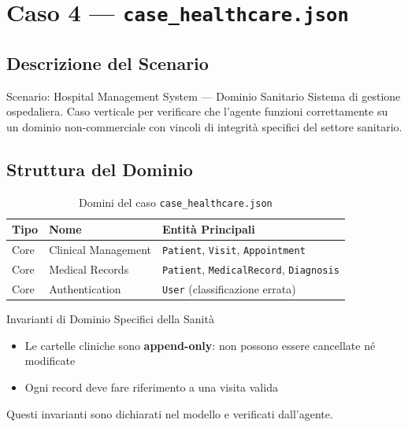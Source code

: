 \documentclass[12pt,a4paper]{report}
\begin{document}
\clearpage

\chapter{Caso 4 --- \texttt{case\_healthcare.json}}

\section{Descrizione del Scenario}

\begin{technicalbox}{Scenario: Hospital Management System --- Dominio Sanitario}
Sistema di gestione ospedaliera. Caso verticale per verificare che l'agente funzioni
correttamente su un dominio non-commerciale con vincoli di integrità specifici del
settore sanitario.
\end{technicalbox}

\section{Struttura del Dominio}

\begin{table}[H]
\centering
\renewcommand{\arraystretch}{1.3}
\begin{tabularx}{\textwidth}{l l X}
\toprule
\textbf{Tipo} & \textbf{Nome} & \textbf{Entità Principali} \\
\midrule
Core & Clinical Management & \texttt{Patient}, \texttt{Visit}, \texttt{Appointment} \\
Core & Medical Records     & \texttt{Patient}, \texttt{MedicalRecord}, \texttt{Diagnosis} \\
Core & Authentication      & \texttt{User} \textcolor{colorhigh}{(classificazione errata)} \\
\bottomrule
\end{tabularx}
\caption{Domini del caso \texttt{case\_healthcare.json}}
\label{tab:health-domains}
\end{table}

\begin{technicalbox}{Invarianti di Dominio Specifici della Sanità}
\begin{itemize}
  \item Le cartelle cliniche sono \textbf{append-only}: non possono essere cancellate né modificate
  \item Ogni record deve fare riferimento a una visita valida
\end{itemize}
Questi invarianti sono dichiarati nel modello e verificati dall'agente.
\end{technicalbox}
\clearpage
\end{document}
